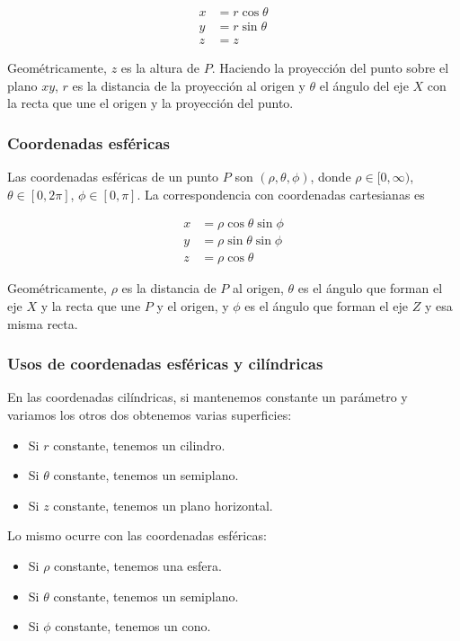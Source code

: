 \documentclass[12pt,a4paper,titlepage]{apuntes}
\begin{document}
\begin{align*}
x &=r \cos \theta \\
y &= r \sin \theta \\
z &= z
\end{align*}

Geométricamente, $z$ es la altura de $P$. Haciendo la proyección del punto sobre el plano $xy$, $r$ es la distancia de la proyección al origen y $\theta$ el ángulo del eje $X$ con la recta que une el origen y la proyección del punto.

\subsubsection{Coordenadas esféricas}
Las coordenadas esféricas de un punto $P$ son $(\rho, \theta, \phi)$, donde $\rho \in [0, \infty)$, $\theta\in [0, 2\pi]$, $\phi \in [0, \pi]$. La correspondencia con coordenadas cartesianas es

\begin{align*}
x&=\rho \cos \theta \sin \phi \\
y&= \rho \sin \theta \sin \phi \\
z &= \rho \cos \theta
\end{align*}

Geométricamente, $\rho$ es la distancia de $P$ al origen, $\theta$ es el ángulo que forman el eje $X$ y la recta que une $P$ y el origen, y $\phi$ es el ángulo que forman el eje $Z$ y esa misma recta.

\subsubsection{Usos de coordenadas esféricas y cilíndricas}

En las coordenadas cilíndricas, si mantenemos constante un parámetro y variamos los otros dos obtenemos varias superficies:

\begin{itemize}
\item Si $r$ constante, tenemos un cilindro. 
\item Si $\theta$ constante, tenemos un semiplano. 
\item Si $z$ constante, tenemos un plano horizontal. 
\end{itemize}

Lo mismo ocurre con las coordenadas esféricas:

\begin{itemize}
\item Si $\rho$ constante, tenemos una esfera. 
\item Si $\theta$ constante, tenemos un semiplano.
\item Si $\phi$ constante, tenemos un cono. 
\end{itemize}
\end{document}
